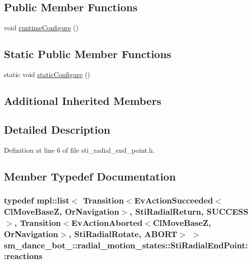 \subsection*{Public Member Functions}
\begin{DoxyCompactItemize}
\item 
void \hyperlink{structsm__dance__bot__3_1_1radial__motion__states_1_1StiRadialEndPoint_ac5fb5d9c2bba274287eb4348e1c0c9c7}{runtime\+Configure} ()
\end{DoxyCompactItemize}
\subsection*{Static Public Member Functions}
\begin{DoxyCompactItemize}
\item 
static void \hyperlink{structsm__dance__bot__3_1_1radial__motion__states_1_1StiRadialEndPoint_af4c534c670c23adacad01b1396949154}{static\+Configure} ()
\end{DoxyCompactItemize}
\subsection*{Additional Inherited Members}


\subsection{Detailed Description}


Definition at line 6 of file sti\+\_\+radial\+\_\+end\+\_\+point.\+h.



\subsection{Member Typedef Documentation}
\subsubsection[{\texorpdfstring{reactions}{reactions}}]{\setlength{\rightskip}{0pt plus 5cm}typedef mpl\+::list$<$ Transition$<$Ev\+Action\+Succeeded$<${\bf Cl\+Move\+BaseZ}, {\bf Or\+Navigation}$>$, {\bf Sti\+Radial\+Return}, {\bf S\+U\+C\+C\+E\+SS}$>$, Transition$<$Ev\+Action\+Aborted$<${\bf Cl\+Move\+BaseZ}, {\bf Or\+Navigation}$>$, {\bf Sti\+Radial\+Rotate}, A\+B\+O\+RT$>$ $>$ {\bf sm\+\_\+dance\+\_\+bot\+\_\+::radial\+\_\+motion\+\_\+states\+::\+Sti\+Radial\+End\+Point\+::reactions}}\hypertarget{structsm__dance__bot__3_1_1radial__motion__states_1_1StiRadialEndPoint_ab1bafa0775ab607c98e9f410224ac5a8}{}\label{structsm__dance__bot__3_1_1radial__motion__states_1_1StiRadialEndPoint_ab1bafa0775ab607c98e9f410224ac5a8}


